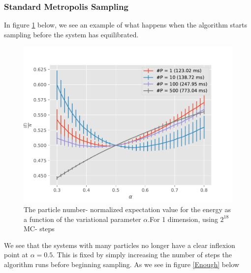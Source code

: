\documentclass[11pt,a4paper,titlepage]{article}
\begin{document}
\subsubsection{Standard Metropolis Sampling}
In figure \ref{TooFew} below, we see an example of what happens when the algorithm starts sampling before the system has equilibrated. 
\begin{figure}[H]
\centering

\includegraphics[trim=0cm 0.0cm 0cm 1.0cm, clip=true,scale = 0.7]{D_1_HarmonicOscillator SimpleGaussian Analytical_2pow18.pdf}
\caption[Insufficient equilibration steps]{The particle number- normalized expectation value for the energy as a function of the variational parameter $\alpha$.For 1 dimension, using $2^{18}$ MC- steps}\label{TooFew}
\end{figure}
We see that the systems with many particles no longer have a clear inflexion point at $\alpha = 0.5$. This is fixed by simply increasing the number of steps the algorithm runs before beginning sampling. As we see in figure \ref{Enough} below
\end{document}
